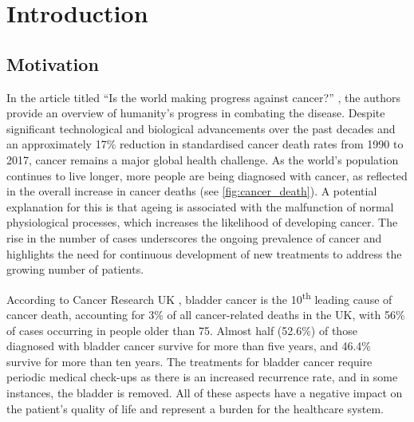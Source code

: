 
\chapter{Introduction}

\vspace{3mm}
\vspace{3mm}


\section{Motivation}


In the article titled “Is the world making progress against cancer?” \citep{Roser2015-qb}, the authors provide an overview of humanity’s progress in combating the disease. Despite significant technological and biological advancements over the past decades and an approximately 17\% reduction in standardised cancer death rates from 1990 to 2017, cancer remains a major global health challenge. As the world’s population continues to live longer, more people are being diagnosed with cancer, as reflected in the overall increase in cancer deaths (see \cref{fig:cancer_death}). A potential explanation for this is that ageing is associated with the malfunction of normal physiological processes, which increases the likelihood of developing cancer. The rise in the number of cases underscores the ongoing prevalence of cancer and highlights the need for continuous development of new treatments to address the growing number of patients.


According to Cancer Research UK \citeyearpar{Cancer_Research_UK2015-cf}, bladder cancer is the 10\textsuperscript{th} leading cause of cancer death, accounting for 3\% of all cancer-related deaths in the UK, with 56\% of cases occurring in people older than 75. Almost half (52.6\%) of those diagnosed with bladder cancer survive for more than five years, and 46.4\% survive for more than ten years. The treatments for bladder cancer require periodic medical check-ups as there is an increased recurrence rate, and in some instances, the bladder is removed. All of these aspects have a negative impact on the patient’s quality of life and represent a burden for the healthcare system.

